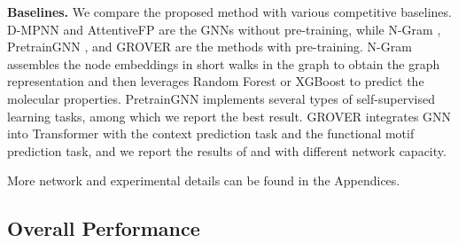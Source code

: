 \documentclass{article}
\begin{document}
\textbf{Baselines.}
We compare the proposed method with various competitive baselines. D-MPNN \cite{doi:10.1021/acs.jcim.9b00237} and AttentiveFP \cite{doi:10.1021/acs.jmedchem.9b00959} are the GNNs without pre-training, while N-Gram \cite{DBLP:conf/nips/LiuDL19}, PretrainGNN \cite{DBLP:conf/iclr/HuLGZLPL20}, and GROVER \cite{DBLP:conf/nips/RongBXX0HH20} are the methods with pre-training. N-Gram assembles the node embeddings in short walks in the graph to obtain the graph representation and then leverages Random Forest or XGBoost to predict the molecular properties. PretrainGNN implements several types of self-supervised learning tasks, among which we report the best result. GROVER integrates GNN into Transformer with the context prediction task and the functional motif prediction task, and we report the results of  and  with different network capacity.


More network and experimental details can be found in the Appendices.



\subsection{Overall Performance}
\end{document}
